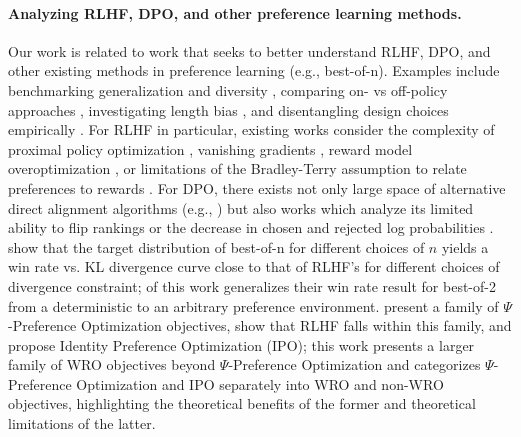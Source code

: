 \paragraph{Analyzing RLHF, DPO, and other preference learning methods.}
Our work is related to work that seeks to 
better understand RLHF, DPO, and other existing methods in preference learning (e.g., best-of-n). 
Examples include benchmarking generalization and diversity \citep{kirk2024understanding}, comparing on- vs off-policy approaches \citep{tajwar2024preferencefinetuningllmsleverage}, investigating length bias \citep{singhal2024longwaygoinvestigating}, and disentangling design choices empirically \citep{ivison2024unpackingdpoppodisentangling}. 
For RLHF in particular, 
existing works consider
the complexity of proximal policy optimization
\citep{ahmadian2024back},
vanishing gradients \citep{Razin2023VanishingGI},
reward model overoptimization \citep{zhu2024iterative}, or
limitations of the Bradley-Terry assumption to relate preferences to rewards
\citep{wang2024transforming,azar2023general,munos2023nash}.
For DPO, there exists not only large space of alternative direct alignment algorithms (e.g., \citep{zhao2023slichf,azar2023general, xu2024contrastivepreferenceoptimizationpushing,  huang2024correctingmythosklregularizationdirect,pal2024smaugfixingfailuremodes,xu2024thingscringeothersiterative}) but also works which analyze its limited ability to flip rankings 
\citep{Chen2024PreferenceLA} or the decrease in chosen and rejected log probabilities \citep{razin2024unintentionalunalignmentlikelihooddisplacement}.
\citet{gui2024bonbonalignmentlargelanguage} show that the target distribution of best-of-n for different choices of $n$ yields a win rate vs. KL divergence curve close to that of RLHF's for different choices of divergence constraint;  of this work generalizes their win rate result for best-of-2 from a deterministic to an arbitrary preference environment.
\citet{azar2023general} present a family of $\Psi$-Preference Optimization objectives,
show that RLHF falls within this family, and propose Identity Preference Optimization (IPO); this work presents a larger family of WRO objectives beyond $\Psi$-Preference Optimization and categorizes $\Psi$-Preference Optimization and IPO separately into WRO and non-WRO objectives, highlighting the 
theoretical benefits of the former and theoretical limitations of the latter.